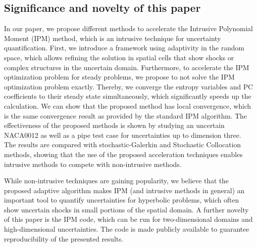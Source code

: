\documentclass[10pt,a4paper]{article}      %
\begin{document}
{\centering
\subsection*{Significance and novelty of this paper}}
In our paper, we propose different methods to accelerate the Intrusive Polynomial Moment (IPM) method, which is an intrusive technique for uncertainty quantification. First, we introduce a framework using adaptivity in the random space, which allows refining the solution in spatial cells that show shocks or complex structures in the uncertain domain. Furthermore, to accelerate the IPM optimization problem for steady problems, we propose to not solve the IPM optimization problem exactly. Thereby, we converge the entropy variables and PC coefficients to their steady state simultaneously, which significantly speeds up the calculation. We can show that the proposed method has local convergence, which is the same convergence result as provided by the standard IPM algorithm. The effectiveness of the proposed methods is shown by studying an uncertain NACA0012 as well as a pipe test case for uncertainties up to dimension three. The results are compared with stochastic-Galerkin and Stochastic Collocation methods, showing that the use of the proposed acceleration techniques enables intrusive methods to compete with non-intrusive methods. 

While non-intrusive techniques are gaining popularity, we believe that the proposed adaptive algorithm makes IPM (and intrusive methods in general) an important tool to quantify uncertainties for hyperbolic problems, which often show uncertain shocks in small portions of the spatial domain. A further novelty of this paper is the IPM code, which can be run for two-dimensional domains and high-dimensional uncertainties. The code is made publicly available to guarantee reproducibility of the presented results.


\end{document}

